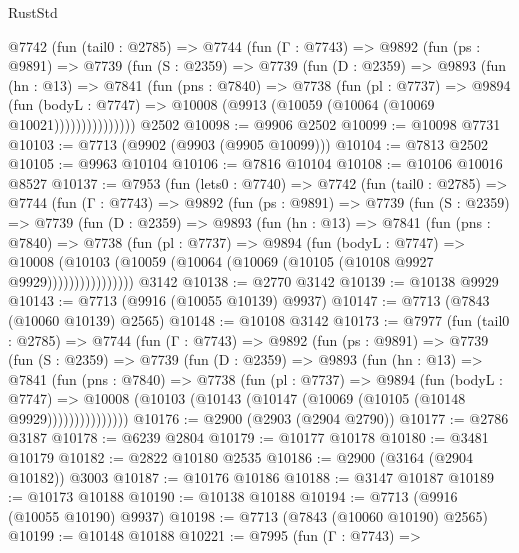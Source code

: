 \begin{lexlean}{RustStd}
\begin{coremodule}
      @7742
        (fun (tail0 : @2785) =>
        @7744
          (fun (Γ : @7743) =>
          @9892
            (fun (ps : @9891) =>
            @7739
              (fun (S : @2359) =>
              @7739
                (fun (D : @2359) =>
                @9893
                  (fun (hn : @13) =>
                  @7841
                    (fun (pns : @7840) =>
                    @7738
                      (fun (pl : @7737) =>
                      @9894
                        (fun (bodyL : @7747) =>
                        @10008 (@9913 (@10059 (@10064 (@10069 @10021)))))))))))))))
    @2502
@10098 := @9906 @2502
@10099 := @10098 @7731
@10103 := @7713 (@9902 (@9903 (@9905 @10099)))
@10104 := @7813 @2502
@10105 := @9963 @10104
@10106 := @7816 @10104
@10108 := @10106 @10016 @8527
@10137 := @7953
    (fun (lets0 : @7740) =>
    @7742
      (fun (tail0 : @2785) =>
      @7744
        (fun (Γ : @7743) =>
        @9892
          (fun (ps : @9891) =>
          @7739
            (fun (S : @2359) =>
            @7739
              (fun (D : @2359) =>
              @9893
                (fun (hn : @13) =>
                @7841
                  (fun (pns : @7840) =>
                  @7738
                    (fun (pl : @7737) =>
                    @9894
                      (fun (bodyL : @7747) =>
                      @10008
                        (@10103 (@10059 (@10064 (@10069 (@10105 (@10108 @9927 @9929))))))))))))))))
    @3142
@10138 := @2770 @3142
@10139 := @10138 @9929
@10143 := @7713 (@9916 (@10055 @10139) @9937)
@10147 := @7713 (@7843 (@10060 @10139) @2565)
@10148 := @10108 @3142
@10173 := @7977
    (fun (tail0 : @2785) =>
    @7744
      (fun (Γ : @7743) =>
      @9892
        (fun (ps : @9891) =>
        @7739
          (fun (S : @2359) =>
          @7739
            (fun (D : @2359) =>
            @9893
              (fun (hn : @13) =>
              @7841
                (fun (pns : @7840) =>
                @7738
                  (fun (pl : @7737) =>
                  @9894
                    (fun (bodyL : @7747) =>
                    @10008 (@10103 (@10143 (@10147 (@10069 (@10105 (@10148 @9929)))))))))))))))
@10176 := @2900 (@2903 (@2904 @2790))
@10177 := @2786 @3187
@10178 := @6239 @2804
@10179 := @10177 @10178
@10180 := @3481 @10179
@10182 := @2822 @10180 @2535
@10186 := @2900 (@3164 (@2904 @10182)) @3003
@10187 := @10176 @10186
@10188 := @3147 @10187
@10189 := @10173 @10188
@10190 := @10138 @10188
@10194 := @7713 (@9916 (@10055 @10190) @9937)
@10198 := @7713 (@7843 (@10060 @10190) @2565)
@10199 := @10148 @10188
@10221 := @7995
    (fun (Γ : @7743) =>

\end{coremodule}
\end{lexlean}
